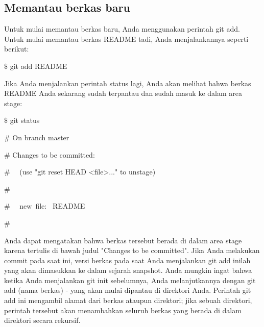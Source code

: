 \subsection {Memantau berkas baru}
\vspace{14pt}
\noindent 
{\fontsize{14pt}{14pt}\selectfont Untuk mulai memantau berkas baru, Anda menggunakan perintah $  $git add. Untuk mulai memantau berkas README tadi, Anda menjalankannya seperti berikut: \\} \par
\vspace{14pt}
\noindent 
{\fontsize{14pt}{14pt}\selectfont  $  \$  $ git add README \\} \par
\vspace{14pt}
\noindent 
{\fontsize{14pt}{14pt}\selectfont Jika Anda menjalankan perintah $  $status $  $lagi, Anda akan melihat bahwa berkas README Anda sekarang sudah terpantau dan sudah masuk ke dalam area stage: \\} \par
\vspace{14pt}
\noindent 
{\fontsize{14pt}{14pt}\selectfont  $  \$  $ git status \\} \par
\noindent 
{\fontsize{14pt}{14pt}\selectfont  $  \#  $ On branch master \\} \par
\noindent 
{\fontsize{14pt}{14pt}\selectfont  $  \#  $ Changes to be committed: \\} \par
\noindent 
{\fontsize{14pt}{14pt}\selectfont  $  \#  $~~ (use "git reset HEAD <file>..." to unstage) \\} \par
\noindent 
{\fontsize{14pt}{14pt}\selectfont  $  \#  $ \\} \par
\noindent 
{\fontsize{14pt}{14pt}\selectfont  $  \#  $~~ new~file:~  README \\} \par
\noindent 
{\fontsize{14pt}{14pt}\selectfont  $  \#  $ \\} \par
\noindent 
{\fontsize{14pt}{14pt}\selectfont Anda dapat mengatakan bahwa berkas tersebut berada di dalam area stage karena tertulis di bawah judul "Changes to be committed". Jika Anda melakukan commit pada saat ini, versi berkas pada saat Anda menjalankan $  $git add $  $inilah yang akan dimasukkan ke dalam sejarah snapshot. Anda mungkin ingat bahwa ketika Anda menjalankan $  $git init $  $sebelumnya, Anda melanjutkannya dengan $  $git add (nama berkas) $  $- yang akan mulai dipantau di direktori Anda. Perintah $  $git add $  $ini mengambil alamat dari berkas ataupun direktori; jika sebuah direktori, perintah tersebut akan menambahkan seluruh berkas yang berada di dalam direktori secara rekursif. \\} \par
